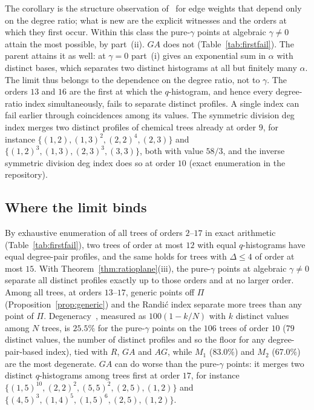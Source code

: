 \documentclass[a5paper, 10pt]{article}
\theoremstyle{plain}
\theoremstyle{remark}
\theoremstyle{definition}
\begin{document}
  The corollary is the structure observation of~\cite[Proposition~2.5]{Rada2019ExpVDB}
  for edge weights that depend only on the degree ratio; what is new are
  the explicit witnesses and the orders at which they first occur.
  Within this class the pure-$\gamma$ points at algebraic $\gamma \neq 0$
  attain the most possible, by part~(ii). $GA$ does not
  (Table~\ref{tab:firstfail}). The parent attains it as well: at
  $\gamma = 0$ part~(i) gives an exponential sum in $\alpha$ with distinct
  bases, which separates two distinct histograms at all but finitely many
  $\alpha$. The limit thus belongs to the dependence on the degree ratio,
  not to $\gamma$. The orders $13$ and $16$ are the first at which the $q$-histogram, and
  hence every degree-ratio index simultaneously, fails to separate
  distinct profiles. A single index can fail earlier through coincidences
  among its values. The symmetric division deg index merges two distinct
  profiles of chemical trees already at order $9$, for instance
  $\{(1,2), (1,3)^{2}, (2,2)^{4}, (2,3)\}$ and
  $\{(1,2)^{3}, (1,3), (2,3)^{3}, (3,3)\}$, both with value $58/3$, and the
  inverse symmetric division deg index does so at order $10$ (exact
  enumeration in the repository).

\subsection{Where the limit binds}\label{sec:degeneracy}

By exhaustive enumeration of all trees of orders $2$--$17$ in exact
arithmetic (Table~\ref{tab:firstfail}), two trees of order at most $12$
with equal $q$-histograms have equal degree-pair profiles, and the same
holds for trees with $\Delta \le 4$ of order at most $15$. With
Theorem~\ref{thm:ratioplane}(iii), the pure-$\gamma$ points at algebraic
$\gamma \neq 0$ separate all distinct profiles exactly up to those
orders and at no larger order. Among all trees, at orders $13$--$17$,
generic points off $\Pi$ (Proposition~\ref{prop:generic}) and the Randi\'c
index separate more trees than any point of $\Pi$. Degeneracy~\cite{Konstantinova1996Degeneracy},
measured as $100(1 - k/N)$ with $k$ distinct values among $N$ trees, is
$25.5\%$ for the pure-$\gamma$ points on the $106$ trees of order $10$
($79$ distinct values, the number of distinct profiles and so the floor for
any degree-pair-based index), tied with $R$, $GA$
and $AG$, while $M_1$ ($83.0\%$) and $M_2$ ($67.0\%$) are the most
degenerate. $GA$ can do worse than the pure-$\gamma$ points: it merges two
distinct $q$-histograms among trees first at order $17$, for instance
$\{(1,5)^{10}, (2,2)^{2}, (5,5)^{2}, (2,5), (1,2)\}$ and
$\{(4,5)^{3}, (1,4)^{5}, (1,5)^{6}, (2,5), (1,2)\}$.
\end{document}
